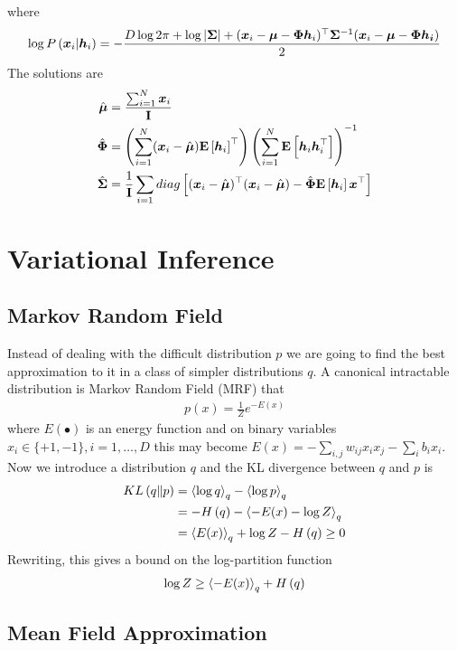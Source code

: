 where
\begin{align*}
	\log P\left(\boldsymbol{x}_i|\boldsymbol{h}_i\right)=-\frac{D\log 2\pi+\log\left\vert \mathbf{\Sigma} \right\vert+(\boldsymbol{x}_i-\boldsymbol{\mu}-\mathbf{\Phi}\boldsymbol{h}_i)^\top\mathbf{\Sigma}^{-1}(\boldsymbol{x}_i-\boldsymbol{\mu}-\mathbf{\Phi}\boldsymbol{h_i})}{2}
\end{align*}
The solutions are
\begin{align*}
	\hat{\boldsymbol{\mu}}&=\frac{\sum_{i=1}^N\boldsymbol{x}_i}{\mathbf{I}} \\
	\hat{\mathbf{\Phi}}&=\left(\sum_{i=1}^N(\boldsymbol{x}_i-\hat{\boldsymbol{\mu}})\mathbf{E}\left[\boldsymbol{h}_i\right]^\top\right)\left(\sum_{i=1}^N\mathbf{E}\left[\boldsymbol{h}_i\boldsymbol{h}_i^\top\right]\right)^{-1} \\
	\hat{\mathbf{\Sigma}}&=\frac{1}{\mathbf{I}}\sum_{i=1}diag\left[(\boldsymbol{x}_i-\hat{\boldsymbol{\mu}})^\top(\boldsymbol{x}_i-\hat{\boldsymbol{\mu}})-\hat{\mathbf{\Phi}}\mathbf{E}\left[\boldsymbol{h}_i\right]\boldsymbol{x}^\top\right]
\end{align*}



\section{Variational Inference}
\label{section12.3}

\subsection{Markov Random Field}

Instead of dealing with the difficult distribution $p$ we are going to find the best approximation to it in a class of simpler distributions $q$. A canonical intractable distribution is Markov Random Field (MRF) that
\begin{align*}
	p(x)=\frac{1}{Z}e^{-E(x)}
\end{align*}
where $E(\bullet)$ is an energy function and on binary variables $x_i\in\{+1,-1\},i=1,\dots,D$ this may become $E(x)=-\sum_{i,j}w_{ij}x_ix_j-\sum_ib_ix_i$. Now we introduce a distribution $q$ and the KL divergence between $q$ and $p$ is
\begin{align*}
	KL\left(q\|p\right)&=\left\langle\log q\right\rangle_q-\left\langle\log p\right\rangle_q \\
	&=-H\left(q\right)-\left\langle-E(x)-\log Z\right\rangle_q \\
	&=\left\langle E(x)\right\rangle_q+\log Z-H\left(q\right)\geq 0
\end{align*}
Rewriting, this gives a bound on the log-partition function
\begin{align*}
	\log Z\geq\left\langle-E(x)\right\rangle_q+H\left(q\right)
\end{align*}

\subsection{Mean Field Approximation}

